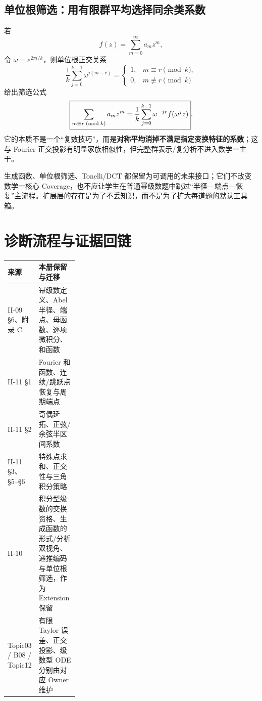 \documentclass[11pt,a4paper,fontset=fandol]{ctexart}
\begin{document}
\subsection{单位根筛选：用有限群平均选择同余类系数}
若
\[
f(z)=\sum_{m=0}^{\infty}a_mz^m,
\]
令 $\omega=e^{2\pi i/k}$，则单位根正交关系
\[
\frac1k\sum_{j=0}^{k-1}\omega^{j(m-r)}
=\begin{cases}
1,&m\equiv r\pmod k,\\
0,&m\not\equiv r\pmod k
\end{cases}
\]
给出筛选公式
\[
\boxed{
\sum_{m\equiv r\;({\rm mod}\;k)}a_mz^m
=\frac1k\sum_{j=0}^{k-1}\omega^{-jr}f(\omega^jz)
}.
\]
它的本质不是一个“复数技巧”，而是\textbf{对称平均消掉不满足指定变换特征的系数}；这与 Fourier 正交投影有明显家族相似性，但完整群表示/复分析不进入数学一主干。

\begin{tcolorbox}[title=Extension 边界]
生成函数、单位根筛选、Tonelli/DCT 都保留为可调用的未来接口；它们不改变数学一核心 Coverage，也不应让学生在普通幂级数题中跳过“半径—端点—恢复”主流程。扩展层的存在是为了不丢知识，而不是为了扩大每道题的默认工具箱。
\end{tcolorbox}

\section{诊断流程与证据回链}
\begin{center}
\end{center}

\begin{tabularx}{\linewidth}{L{0.28\linewidth}Y}
\toprule
来源 & 本册保留与迁移 \\
\midrule
II-09 §6、附录 C & 幂级数定义、Abel 半径、端点、母函数、逐项微积分、和函数 \\
II-11 §1 & Fourier 和函数、连续/跳跃点恢复与周期端点 \\
II-11 §2 & 奇偶延拓、正弦/余弦半区间系数 \\
II-11 §3、§5--§6 & 特殊点求和、正交性与三角积分策略 \\
II-10 & 积分型级数的交换资格、生成函数的形式/分析双视角、递推编码与单位根筛选，作为 Extension 保留 \\
Topic03 / B08 / Topic12 & 有限 Taylor 误差、正交投影、级数型 ODE 分别由对应 Owner 维护 \\
\bottomrule
\end{tabularx}
\end{document}
